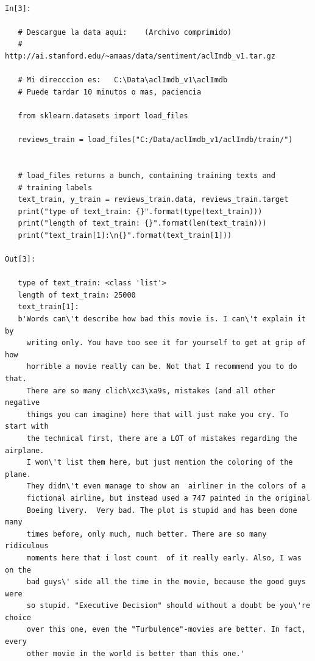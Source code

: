 \begin{lstlisting}

In[3]:

   # Descargue la data aqui:    (Archivo comprimido)
   #      http://ai.stanford.edu/~amaas/data/sentiment/aclImdb_v1.tar.gz
   
   # Mi direcccion es:   C:\Data\aclImdb_v1\aclImdb
   # Puede tardar 10 minutos o mas, paciencia
   
   from sklearn.datasets import load_files
   
   reviews_train = load_files("C:/Data/aclImdb_v1/aclImdb/train/")

  
   # load_files returns a bunch, containing training texts and 
   # training labels
   text_train, y_train = reviews_train.data, reviews_train.target
   print("type of text_train: {}".format(type(text_train)))
   print("length of text_train: {}".format(len(text_train)))
   print("text_train[1]:\n{}".format(text_train[1]))
  
Out[3]:

   type of text_train: <class 'list'>
   length of text_train: 25000
   text_train[1]:
   b'Words can\'t describe how bad this movie is. I can\'t explain it by
     writing only. You have too see it for yourself to get at grip of how 
     horrible a movie really can be. Not that I recommend you to do that. 
     There are so many clich\xc3\xa9s, mistakes (and all other negative 
     things you can imagine) here that will just make you cry. To start with 
     the technical first, there are a LOT of mistakes regarding the airplane.
     I won\'t list them here, but just mention the coloring of the plane. 
     They didn\'t even manage to show an  airliner in the colors of a 
     fictional airline, but instead used a 747 painted in the original 
     Boeing livery.  Very bad. The plot is stupid and has been done many 
     times before, only much, much better. There are so many ridiculous
     moments here that i lost count  of it really early. Also, I was on the
     bad guys\' side all the time in the movie, because the good guys were 
     so stupid. "Executive Decision" should without a doubt be you\'re choice
     over this one, even the "Turbulence"-movies are better. In fact, every
     other movie in the world is better than this one.'

\end{lstlisting}

